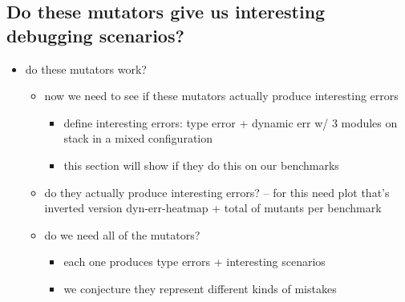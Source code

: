 \subsection{Do these mutators give us interesting debugging scenarios?}
\begin{itemize}
\item do these mutators work?
\begin{itemize}
\item now we need to see if these mutators actually produce interesting errors
\begin{itemize}
\item define interesting errors: type error + dynamic err w/ 3 modules on stack in a mixed configuration
\item this section will show if they do this on our benchmarks
\end{itemize}
\item do they actually produce interesting errors? -- for this need plot that's inverted version dyn-err-heatmap + total of mutants per benchmark
\item do we need all of the mutators?
\begin{itemize}
\item each one produces type errors + interesting scenarios
\item we conjecture they represent different kinds of mistakes
\end{itemize}
\end{itemize}
\end{itemize}

